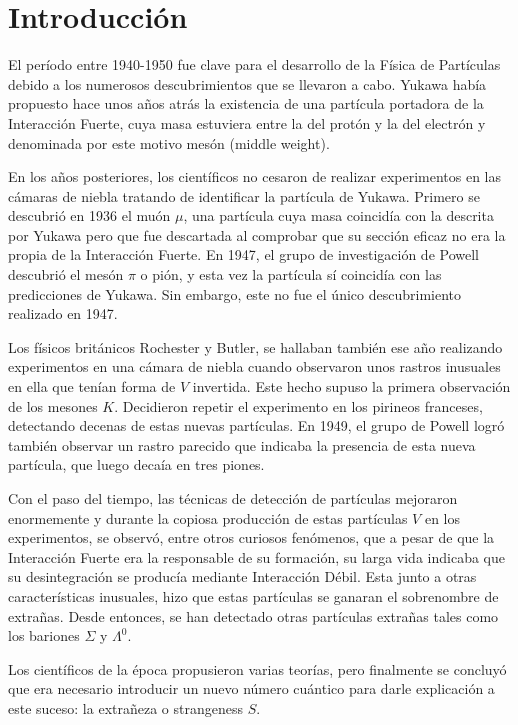 \renewcommand{\listtablename}{Índice de tablas}
\renewcommand{\tablename}{Tabla}

\chapter{Introducción}\label{cap:intro}
El período entre 1940-1950 fue clave para el desarrollo de la Física de Partículas debido a los numerosos descubrimientos que se llevaron a cabo. Yukawa había propuesto hace unos años atrás la existencia de una partícula portadora de la Interacción Fuerte, cuya masa estuviera entre la del protón y la del electrón y denominada por este motivo mesón (middle weight). \cite{Griffiths2008}
 
En los años posteriores, los científicos no cesaron de realizar experimentos en las cámaras de niebla tratando de identificar la partícula de Yukawa. Primero se descubrió en 1936 el muón $\mu$, una partícula cuya masa coincidía con la descrita por Yukawa pero que fue descartada al comprobar que su sección eficaz no era la propia de la Interacción Fuerte. En 1947, el grupo de investigación de Powell descubrió el mesón $\pi$ o pión, y esta vez la partícula sí coincidía con las predicciones de Yukawa. Sin embargo, este no fue el único descubrimiento realizado en 1947.

Los físicos británicos Rochester y Butler, se hallaban también ese año realizando experimentos en una cámara de niebla cuando observaron unos rastros inusuales en ella que tenían forma de $V$ invertida. Este hecho supuso la primera observación de los mesones $K$. Decidieron repetir el experimento en los pirineos franceses, detectando decenas de estas nuevas partículas. En 1949, el grupo de Powell logró también observar un rastro parecido que indicaba la presencia de esta nueva partícula, que luego decaía en tres piones. 

Con el paso del tiempo, las técnicas de detección de partículas mejoraron enormemente y durante la copiosa producción de estas partículas $V$ en los experimentos, se observó, entre otros curiosos fenómenos, que a pesar de que la Interacción Fuerte era la responsable de su formación, su larga vida indicaba que su desintegración se producía mediante Interacción Débil. Esta junto a otras características inusuales, hizo que estas partículas se ganaran el sobrenombre de extrañas. Desde entonces, se han detectado otras partículas extrañas tales como los bariones $\Sigma$ y $\Lambda^0$. \cite{Bardeen2012}

Los científicos de la época propusieron varias teorías, pero finalmente se concluyó que era necesario introducir un nuevo número cuántico para darle explicación a este suceso: la extrañeza o strangeness $S$. 

